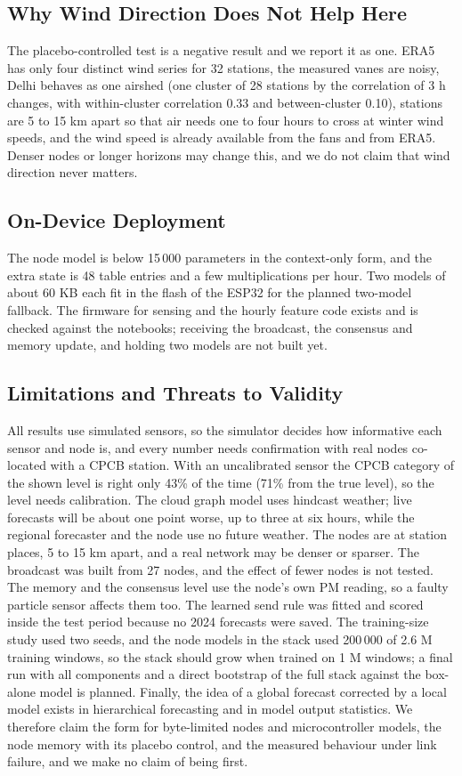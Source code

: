 \documentclass[journal]{IEEEtran}
\begin{document}
\subsection{Why Wind Direction Does Not Help Here}
The placebo-controlled test is a negative result and we report it as one. ERA5 has only four distinct wind series for 32 stations, the measured vanes are noisy, Delhi behaves as one airshed (one cluster of 28 stations by the correlation of 3 h changes, with within-cluster correlation 0.33 and between-cluster 0.10), stations are 5 to 15 km apart so that air needs one to four hours to cross at winter wind speeds, and the wind speed is already available from the fans and from ERA5. Denser nodes or longer horizons may change this, and we do not claim that wind direction never matters.

\subsection{On-Device Deployment}
The node model is below 15\,000 parameters in the context-only form, and the extra state is 48 table entries and a few multiplications per hour. Two models of about 60 KB each fit in the flash of the ESP32 for the planned two-model fallback. The firmware for sensing and the hourly feature code exists and is checked against the notebooks; receiving the broadcast, the consensus and memory update, and holding two models are not built yet.

\subsection{Limitations and Threats to Validity}
All results use simulated sensors, so the simulator decides how informative each sensor and node is, and every number needs confirmation with real nodes co-located with a CPCB station. With an uncalibrated sensor the CPCB category of the shown level is right only 43\% of the time (71\% from the true level), so the level needs calibration. The cloud graph model uses hindcast weather; live forecasts will be about one point worse, up to three at six hours, while the regional forecaster and the node use no future weather. The nodes are at station places, 5 to 15 km apart, and a real network may be denser or sparser. The broadcast was built from 27 nodes, and the effect of fewer nodes is not tested. The memory and the consensus level use the node's own PM reading, so a faulty particle sensor affects them too. The learned send rule was fitted and scored inside the test period because no 2024 forecasts were saved. The training-size study used two seeds, and the node models in the stack used 200\,000 of 2.6 M training windows, so the stack should grow when trained on 1 M windows; a final run with all components and a direct bootstrap of the full stack against the box-alone model is planned. Finally, the idea of a global forecast corrected by a local model exists in hierarchical forecasting and in model output statistics. We therefore claim the form for byte-limited nodes and microcontroller models, the node memory with its placebo control, and the measured behaviour under link failure, and we make no claim of being first.
\end{document}
